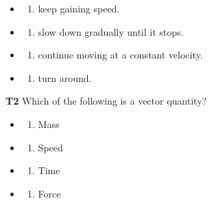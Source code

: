 \documentclass[
]{article}
\providecommand{\tightlist}{%
  \setlength{\itemsep}{0pt}\setlength{\parskip}{0pt}}
\begin{document}
\begin{itemize}
\tightlist
\item
  \begin{enumerate}
  \def\labelenumi{\Alph{enumi})}
  \tightlist
  \item
    keep gaining speed.
  \end{enumerate}
\item
  \begin{enumerate}
  \def\labelenumi{\Alph{enumi})}
  \setcounter{enumi}{1}
  \tightlist
  \item
    slow down gradually until it stops.
  \end{enumerate}
\item
  \begin{enumerate}
  \def\labelenumi{\Alph{enumi})}
  \setcounter{enumi}{2}
  \tightlist
  \item
    continue moving at a constant velocity.
  \end{enumerate}
\item
  \begin{enumerate}
  \def\labelenumi{\Alph{enumi})}
  \setcounter{enumi}{3}
  \tightlist
  \item
    turn around.
  \end{enumerate}
\end{itemize}

\textbf{T2} Which of the following is a vector quantity?

\begin{itemize}
\tightlist
\item
  \begin{enumerate}
  \def\labelenumi{\Alph{enumi})}
  \tightlist
  \item
    Mass
  \end{enumerate}
\item
  \begin{enumerate}
  \def\labelenumi{\Alph{enumi})}
  \setcounter{enumi}{1}
  \tightlist
  \item
    Speed
  \end{enumerate}
\item
  \begin{enumerate}
  \def\labelenumi{\Alph{enumi})}
  \setcounter{enumi}{2}
  \tightlist
  \item
    Time
  \end{enumerate}
\item
  \begin{enumerate}
  \def\labelenumi{\Alph{enumi})}
  \setcounter{enumi}{3}
  \tightlist
  \item
    Force
  \end{enumerate}
\end{itemize}
\end{document}
